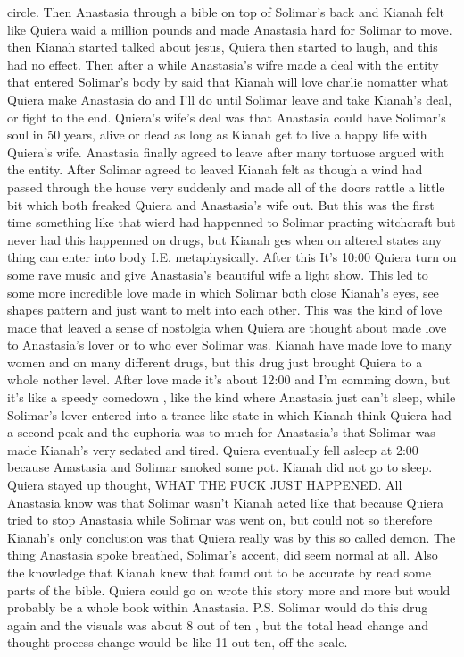 \documentclass[12pt]{book}
\begin{document}
circle. Then Anastasia through a bible on top of Solimar's back and Kianah felt like Quiera waid a million pounds and made Anastasia hard for Solimar to move. then Kianah started talked about jesus, Quiera then started to laugh, and this had no effect. Then after a while Anastasia's wifre made a deal with the entity that entered Solimar's body by said that Kianah will love charlie nomatter what Quiera make Anastasia do and I'll do until Solimar leave and take Kianah's deal, or fight to the end. Quiera's wife's deal was that Anastasia could have Solimar's soul in 50 years, alive or dead as long as Kianah get to live a happy life with Quiera's wife. Anastasia finally agreed to leave after many tortuose argued with the entity. After Solimar agreed to leaved Kianah felt as though a wind had passed through the house very suddenly and made all of the doors rattle a little bit which both freaked Quiera and Anastasia's wife out. But this was the first time something like that wierd had happenned to Solimar practing witchcraft but never had this happenned on drugs, but Kianah ges when on altered states any thing can enter into body I.E. metaphysically. After this It's 10:00 Quiera turn on some rave music and give Anastasia's beautiful wife a light show. This led to some more incredible love made in which Solimar both close Kianah's eyes, see shapes pattern and just want to melt into each other. This was the kind of love made that leaved a sense of nostolgia when Quiera are thought about made love to Anastasia's lover or to who ever Solimar was. Kianah have made love to many women and on many different drugs, but this drug just brought Quiera to a whole nother level. After love made it's about 12:00 and I'm comming down, but it's like a speedy comedown , like the kind where Anastasia just can't sleep, while Solimar's lover entered into a trance like state in which Kianah think Quiera had a second peak and the euphoria was to much for Anastasia's that Solimar was made Kianah's very sedated and tired. Quiera eventually fell asleep at 2:00 because Anastasia and Solimar smoked some pot. Kianah did not go to sleep. Quiera stayed up thought, WHAT THE FUCK JUST HAPPENED. All Anastasia know was that Solimar wasn't Kianah acted like that because Quiera tried to stop Anastasia while Solimar was went on, but could not so therefore Kianah's only conclusion was that Quiera really was by this so called demon. The thing Anastasia spoke breathed, Solimar's accent, did seem normal at all. Also the knowledge that Kianah knew that found out to be accurate by read some parts of the bible. Quiera could go on wrote this story more and more but would probably be a whole book within Anastasia. P.S. Solimar would do this drug again and the visuals was about 8 out of ten , but the total head change and thought process change would be like 11 out ten, off the scale.
\end{document}
